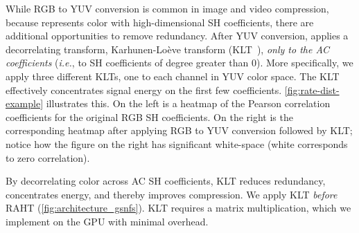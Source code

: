 While RGB to YUV conversion is common in image and video compression, because \gs{} represents color with high-dimensional SH coefficients, there are additional opportunities to remove redundancy. After YUV conversion, \gsnfs{} applies a decorrelating transform, Karhunen-Loève transform (KLT~\cite{KLT}), \textit{only to the AC coefficients} (\textit{i.e.}, to SH coefficients of degree greater than 0). More specifically, we apply three different KLTs, one to each channel in YUV color space.
%
The KLT effectively concentrates signal energy on the first few coefficients.
%
\cref{fig:rate-dist-example} illustrates this.
%
On the left is a heatmap of the Pearson correlation coefficients for the original RGB SH coefficients.
%
On the right is the corresponding heatmap after applying RGB to YUV conversion followed by KLT; notice how the figure on the right has significant white-space (white corresponds to zero correlation).
%

By decorrelating color across AC SH coefficients, KLT reduces redundancy, concentrates energy, and thereby improves compression.
%
We apply KLT \textit{before} RAHT (\cref{fig:architecture_gsnfs}).
%
KLT requires a matrix multiplication, which we implement on the GPU with minimal overhead.



